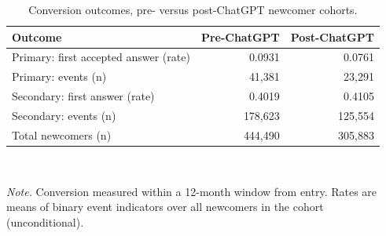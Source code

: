 \begin{table}[htbp]
  \centering
  \caption{Conversion outcomes, pre- versus post-ChatGPT newcomer cohorts.}
  \label{tab:conversion_outcomes}
  \begin{tabular}{lrr}
    \toprule
    Outcome & Pre-ChatGPT & Post-ChatGPT \\
    \midrule
    Primary: first accepted answer (rate) & 0.0931 & 0.0761 \\
    Primary: events (n) & 41,381 & 23,291 \\
    Secondary: first answer (rate) & 0.4019 & 0.4105 \\
    Secondary: events (n) & 178,623 & 125,554 \\
    Total newcomers (n) & 444,490 & 305,883 \\
    \bottomrule
  \end{tabular}
  \\[0.4em]\parbox{0.9\textwidth}{\footnotesize \textit{Note.} Conversion measured within a 12-month window from entry. Rates are means of binary event indicators over all newcomers in the cohort (unconditional).}
\end{table}